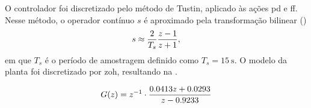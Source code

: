 O controlador foi discretizado pelo método de Tustin, aplicado às ações \gls{pd}
e \gls{ff}. Nesse método, o operador contínuo $s$ é aproximado pela
transformação bilinear ()
\begin{equation}
  \eqlabel{tustin}
  s \approx \frac{2}{T_s}\frac{z-1}{z+1},
\end{equation}
em que $T_s$ é o período de amostragem definido como $T_s = \SI{15}{\second}$.
O modelo da planta foi discretizado por \gls{zoh}, resultando na
.

\begin{equation}
  \eqlabel{planta-gz-zoh}
  G(z) = z^{-1} \cdot \frac{0.0413z + 0.0293}{z - 0.9233}
\end{equation}